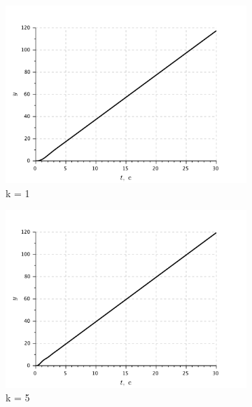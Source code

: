 \documentclass[a3paper, 11pt]{article}
\begin{document}
\begin{figure}[h!]
    \centering
    \begin{subfigure}{0.33\textwidth}
        \centering
        \includegraphics[width = \textwidth]{images/graph2-2-K1.pdf}
        \caption{k = 1}
    \end{subfigure}
    \begin{subfigure}{0.33\textwidth}
        \centering
        \includegraphics[width = \textwidth]{images/graph2-2-K5.pdf}
        \caption{k = 5}
    \end{subfigure}
    \begin{subfigure}{0.33\textwidth}
        \centering

\end{subfigure}
\end{figure}
\end{document}
